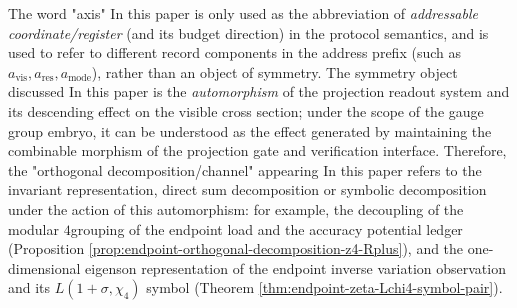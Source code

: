 \begin{remark}\label{rem:axis-vs-automorphism-terminology}
The word "axis" In this paper is only used as the abbreviation of \emph{addressable coordinate/register} (and its budget direction) in the protocol semantics, and is used to refer to different record components in the address prefix (such as \(a_{\mathrm{vis}},a_{\mathrm{res}},a_{\mathrm{mode}}\)), rather than an object of symmetry.
The symmetry object discussed In this paper is the \emph{automorphism} of the projection readout system and its descending effect on the visible cross section; under the scope of the gauge group embryo, it can be understood as the effect generated by maintaining the combinable morphism of the projection gate and verification interface.
Therefore, the "orthogonal decomposition/channel" appearing In this paper refers to the invariant representation, direct sum decomposition or symbolic decomposition under the action of this automorphism: for example, the decoupling of the modular \(4\) ​​grouping of the endpoint load and the accuracy potential ledger (Proposition \ref{prop:endpoint-orthogonal-decomposition-z4-Rplus}), and the one-dimensional eigenson representation of the endpoint inverse variation observation and its \(L(1+\sigma,\chi_4)\) symbol (Theorem \ref{thm:endpoint-zeta-Lchi4-symbol-pair}).
\end{remark}

